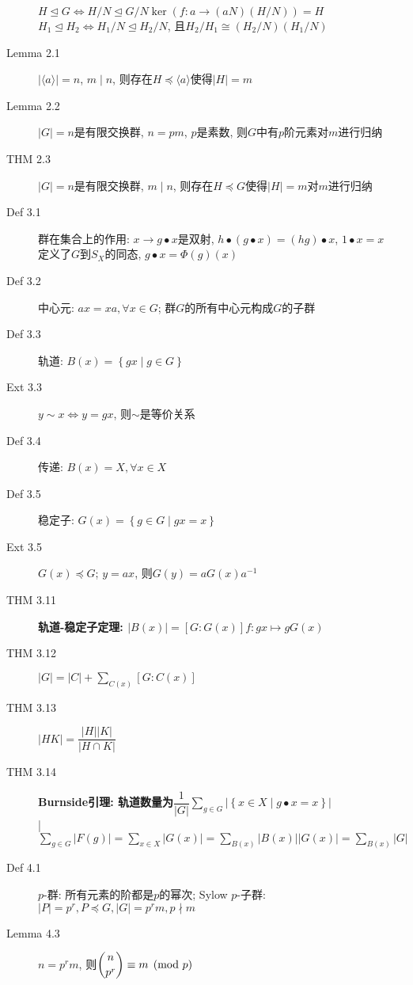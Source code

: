 \documentclass{article}
\renewcommand{\l}{\left}
\renewcommand{\r}{\right}
\begin{document}
\begin{description}
            $H \trianglelefteq G \iff H/N \trianglelefteq G/N$\hfill$\ker (f: a \to (aN)(H/N)) = H$\\
            $H_1 \trianglelefteq H_2 \iff H_1/N \trianglelefteq H_2/N$, 且$H_2/H_1 \cong (H_2/N)(H_1/N)$
        \item[Lemma 2.1] $\l| \langle a \rangle \r| = n$, $m \mid n$, 则存在$H \preceq \langle a \rangle$使得$\l|H\r| = m$
        \item[Lemma 2.2] $\l|G\r| = n$是有限交换群, $n=pm$, $p$是素数, 则$G$中有$p$阶元素\hfill 对$m$进行归纳
        \item[THM 2.3] $\l|G\r| = n$是有限交换群, $m \mid n$, 则存在$H \preceq G$使得$\l| H \r| = m$\hfill 对$m$进行归纳
        \item[Def 3.1] 群在集合上的作用: $x \to g \bullet x$是双射, $h \bullet (g \bullet x) = (hg) \bullet x$, $1 \bullet x = x$\\
            定义了$G$到$S_X$的同态, $g \bullet x = \Phi(g)(x)$
        \item[Def 3.2] 中心元: $ax = xa, \forall x \in G$; 群$G$的所有中心元构成$G$的子群
        \item[Def 3.3] 轨道: $B(x) = \l\{gx \mid g \in G\r\}$
        \item[Ext 3.3] $y \sim x \iff y = gx$, 则$\sim$是等价关系
        \item[Def 3.4] 传递: $B(x) = X, \forall x \in X$
        \item[Def 3.5] 稳定子: $G(x) = \l\{ g \in G \mid gx = x \r\}$
        \item[Ext 3.5] $G(x) \preceq G$; $y = ax$, 则$G(y) = aG(x)a^{-1}$
        \item[THM 3.11] \textbf{轨道-稳定子定理: $\l|B(x)\r| = [G:G(x)]$}\hfill$f: gx \mapsto gG(x)$
        \item[THM 3.12] $\l|G\r| = \l|C\r| + \sum\limits_{C(x)}[G:C(x)]$
        \item[THM 3.13] $\l|HK\r| = \dfrac{\l|H\r|\l|K\r|}{\l|H \cap K\r|}$
        \item[THM 3.14] \textbf{Burnside引理: 轨道数量为$\dfrac{1}{\l|G\r|} \sum\limits_{g \in G} \l|\l\{x \in X \mid g \bullet x = x \r\}\r|$}\\
            |\hfill$\sum\limits_{g \in G} \l|F(g)\r| = \sum\limits_{x \in X} \l|G(x)\r| = \sum\limits_{B(x)} \l|B(x)\r|\l|G(x)\r| = \sum\limits_{B(x)} \l|G\r|$
        \item[Def 4.1] $p$-群: 所有元素的阶都是$p$的幂次; Sylow $p$-子群: $\l|P\r| = p^r, P \preceq G, \l|G\r| = p^rm, p \nmid m$
        \item[Lemma 4.3] $n = p^rm$, 则$\dbinom{n}{p^r} \equiv m \pmod p$

\end{description}
\end{document}
